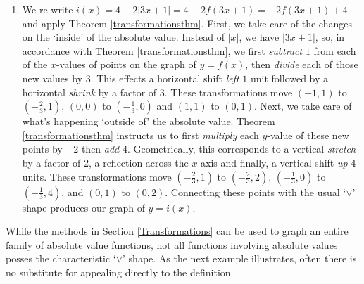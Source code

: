 {\begin{enumerate}
\item We re-write $i(x) = 4-2|3x+1| =  4-2f(3x+1) = -2f(3x+1) + 4$  and apply Theorem \ref{transformationsthm}.  First, we take care of the changes on the `inside' of the absolute value.  Instead of $|x|$, we have $|3x+1|$, so, in accordance with Theorem \ref{transformationsthm}, we first \textit{subtract} $1$ from each of the $x$-values of points on the graph of $y = f(x)$,  then \textit{divide} each of those new values by $3$.  This effects a horizontal shift \textit{left} $1$ unit followed by a horizontal \textit{shrink} by a factor of $3$.  These transformations move $(-1,1)$ to $\left(-\frac{2}{3}, 1 \right)$, $(0,0)$ to $\left(-\frac{1}{3}, 0 \right)$ and $(1,1)$ to $\left(0,1\right)$.  Next, we take care of what's happening `outside of' the absolute value.   Theorem \ref{transformationsthm} instructs us to first \textit{multiply} each $y$-value of these new points by $-2$ then \textit{add} $4$.  Geometrically, this corresponds to a vertical \textit{stretch} by a factor of $2$, a reflection across the $x$-axis and finally, a vertical shift \textit{up} $4$ units.  These transformations move $\left(-\frac{2}{3}, 1 \right)$ to $\left(-\frac{2}{3}, 2 \right)$, $\left(-\frac{1}{3}, 0 \right)$ to $\left(-\frac{1}{3}, 4 \right)$, and $\left(0,1\right)$ to $\left(0, 2\right)$.  Connecting these points with the usual `$\vee$' shape produces our graph of $y = i(x)$.

\end{enumerate}
}

\medskip

While the methods in Section \ref{Transformations} can be used to graph an entire family of absolute value functions, not all functions involving absolute values posses the characteristic `$\vee$' shape.  As the next example illustrates, often there is no substitute for appealing directly to the definition.

\medskip

